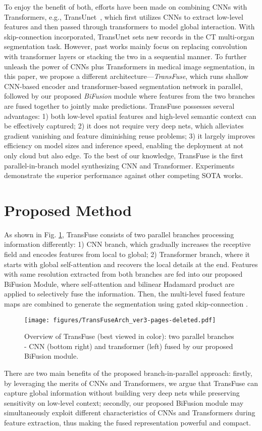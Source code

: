 \documentclass[runningheads]{llncs}
\begin{document}
To enjoy the benefit of both, efforts have been made on combining CNNs with Transformers, e.g., TransUnet~\cite{chen2021transunet}, which first utilizes CNNs to extract low-level features and then passed through transformers to model global interaction. With skip-connection incorporated, TransUnet sets new records in the CT multi-organ segmentation task. However, past works mainly focus on replacing convolution with transformer layers or stacking the two in a sequential manner. To further unleash the power of CNNs plus Transformers in medical image segmentation, in this paper, we propose a different architecture---\textit{TransFuse}, which runs shallow CNN-based encoder and transformer-based segmentation network in parallel, followed by our proposed \textit{BiFusion} module where features from the two branches are fused together to jointly make predictions. TransFuse possesses several advantages: 1) both low-level spatial features and high-level semantic context can be effectively captured; 2) it does not require very deep nets, which alleviates gradient vanishing and feature diminishing reuse problems; 3) it largely improves efficiency on model sizes and inference speed, enabling the deployment at not only cloud but also edge. To the best of our knowledge, TransFuse is the first parallel-in-branch model synthesizing CNN and Transformer. Experiments demonstrate the superior performance against other competing SOTA works.
 
\section{Proposed Method}
As shown in Fig. \ref{fig1}, TransFuse consists of two parallel branches processing information differently: 1) CNN branch, which gradually increases the receptive field and encodes features from local to global; 2) Transformer branch, where it starts with global self-attention and recovers the local details at the end. Features with same resolution extracted from both branches are fed into our proposed BiFusion Module, where self-attention and bilinear Hadamard product are applied to selectively fuse the information. Then, the multi-level fused feature maps are combined to generate the segmentation using gated skip-connection \cite{schlemper2019attention}.
\begin{figure}
\centering
\texttt{[image: figures/TransFuseArch\_ver3-pages-deleted.pdf]}
\caption{Overview of TransFuse (best viewed in color): two parallel branches - CNN (bottom right) and transformer (left) fused by our proposed BiFusion module.} 
\label{fig1}
\end{figure}
There are two main benefits of the proposed branch-in-parallel approach: firstly, 
by leveraging the merits of CNNs and Transformers, we argue that TransFuse can capture global information without building very deep nets while preserving sensitivity on low-level context; secondly, our proposed BiFusion module may simultaneously exploit different characteristics of CNNs and Transformers during feature extraction, thus making the fused representation powerful and compact.
\end{document}
